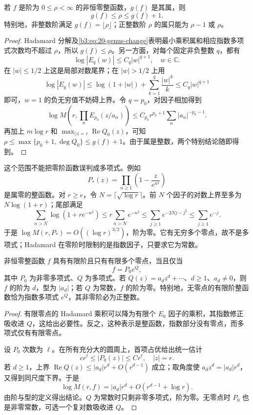 \begin{proposition}[属与阶的范围]\label{b3:prop:20-genus-order}
若 \(f\) 是阶为 \(0\le\rho<\infty\) 的非恒零整函数，\(g(f)\) 是其属，则
\[
 g(f)\le\rho\le g(f)+1.
\]
特别地，非整数阶满足 \(g(f)=\lfloor\rho\rfloor\)；正整数阶 \(\rho\) 的属只能为 \(\rho-1\) 或 \(\rho\)。
\end{proposition}
\begin{proof}
Hadamard 分解及\eqref{b3:eq:20-genus-change}表明最小乘积属和相应指数多项式次数均不超过 \(\rho\)，所以 \(g(f)\le\rho\)。另一方面，对每个固定非负整数 \(q\)，都有
\[
 \log|E_q(w)|\le C_q|w|^{q+1},\quad w\in\mathbb C.
\]
在 \(|w|\le1/2\) 上这是局部对数尾界；在 \(|w|>1/2\) 上用
\[
 \log|E_q(w)|\le\log(1+|w|)
                   +\sum_{k=1}^q\frac{|w|^k}{k}
                 \le C_q|w|^{q+1}
\]
即可，\(w=1\) 的负无穷值不妨碍上界。令 \(q=p_0\)，对因子相加得到
\[
 \log M\left(r,\prod_nE_{p_0}(z/a_n)\right)
 \le C_{p_0}r^{p_0+1}\sum_n|a_n|^{-p_0-1}.
\]
再加上 \(m\log r\) 和 \(\max_{|z|=r}\operatorname{Re}Q_0(z)\)，可知 \(\rho\le\max\{p_0+1,\deg Q_0\}\le g(f)+1\)。由于属是整数，两个特别结论随即得到。
\end{proof}

这个范围不能把零阶函数误判成多项式。例如
\[
 P_*(z)=\prod_{n\ge1}\left(1-\frac{z}{e^{n^2}}\right)
\]
是属零的整函数。对 \(r\ge e\)，令 \(N=\lceil\sqrt{\log r}\rceil\)。前 \(N\) 个因子的对数上界至多为 \(N\log(1+r)\)；尾部满足
\[
 \sum_{n>N}\log(1+re^{-n^2})
 \le r\sum_{n>N}e^{-n^2}
 \le\sum_{j\ge1}e^{-2Nj-j^2}\le\sum_{j\ge1}e^{-j}.
\]
于是 \(\log M(r,P_*)=O((\log r)^{3/2})\)，阶为零。它有无穷多个零点，故不是多项式；Hadamard 在零阶时限制的是指数因子，只要求它为常数。

\begin{corollary}[有限零点与无零点的有限阶函数]\label{b3:cor:20-finite-zeros}
非恒零整函数 \(f\) 具有有限阶且只有有限多个零点，当且仅当
\[
 f=P_0e^Q,
\]
其中 \(P_0\) 为非零多项式、\(Q\) 为多项式。若 \(Q(z)=a_dz^d+\cdots\)、\(d\ge1\)、\(a_d\ne0\)，则 \(f\) 的阶为 \(d\)，型为 \(|a_d|\)；若 \(Q\) 为常数，\(f\) 的阶为零。特别地，无零点的有限阶整函数恰为指数多项式 \(e^Q\)，其非零阶必为正整数。
\end{corollary}
\begin{proof}
有限零点的 Hadamard 乘积可以降为有限个 \(E_0\) 因子的乘积，其指数修正吸收进 \(Q\)，这给出必要性。反之，这种表示是整函数，指数部分没有零点，而多项式仅有有限零点。

设 \(P_0\) 次数为 \(\ell\)。在所有充分大的圆周上，首项占优给出统一估计
\[
 c r^\ell\le|P_0(z)|\le C r^\ell,\quad |z|=r.
\]
若 \(d\ge1\)，上界 \(\operatorname{Re}Q(z)\le|a_d|r^d+O(r^{d-1})\) 成立；取角度使 \(a_dz^d=|a_d|r^d\)，又得到同尺度下界。于是
\[
 \log M(r,f)=|a_d|r^d+O(r^{d-1}+\log r).
\]
由阶与型的定义得出结论。\(Q\) 为常数时只剩非零多项式，阶为零。无零点时 \(P_0\) 也是非零常数，可选一个复对数吸收进 \(Q\)。
\end{proof}

